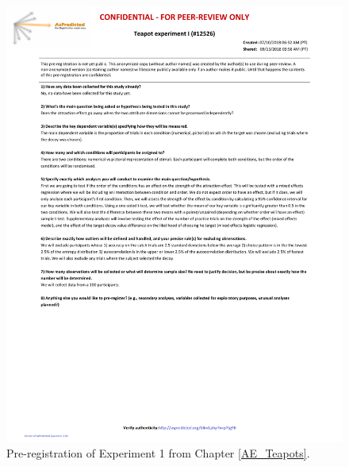 \documentclass[11pt,a4paper]{article}
\begin{document}
 \begin{figure}[H]
    \captionsetup{justification=centering}
\centering
\caption{Pre-registration of Experiment 1 from Chapter \ref{AE_Teapots}.}
\includegraphics[width=1\textwidth]{AE_Teapot_aspred.pdf}
\end{figure}

\newpage
 \label{appchap32} 
  
\end{document}
